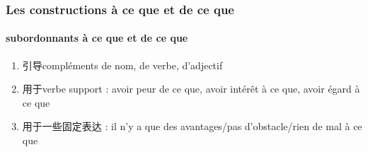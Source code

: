 \documentclass[UTF8]{report}
\begin{document}
\subsubsection{Les constructions à ce que et de ce que}
\paragraph{subordonnants à ce que et de ce que}
\begin{enumerate}
    \item 引导compléments de nom, de verbe, d’adjectif 
    \item 用于verbe support : avoir peur de ce que, avoir intérêt à ce que, avoir égard à ce que
    \item 用于一些固定表达 : il n’y a que des avantages/pas d’obstacle/rien de mal à ce que
\end{enumerate}
\end{document}
